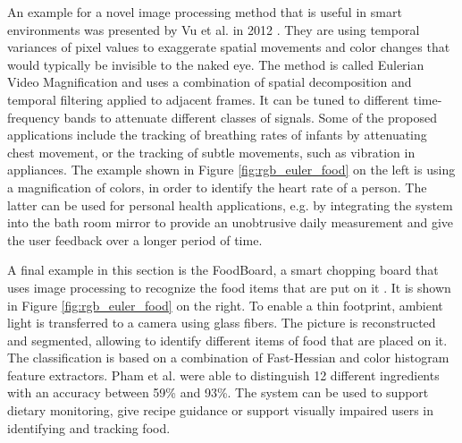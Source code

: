 An example for a novel image processing method that is useful in smart environments was presented by Vu et al. in 2012 \cite{Wu2012}. They are using  temporal variances of pixel values to exaggerate spatial movements and color changes that would typically be invisible to the naked eye. The method is called Eulerian Video Magnification and uses a combination of spatial decomposition and temporal filtering applied to adjacent frames. It can be tuned to different time-frequency bands to attenuate different classes of signals. Some of the proposed applications include the tracking of breathing rates of infants by attenuating chest movement, or the tracking of subtle movements, such as vibration in appliances. The example shown in Figure \ref{fig:rgb_euler_food} on the left is using a magnification of colors, in order to identify the heart rate of a person. The latter can be used for personal health applications, e.g. by integrating the system into the bath room mirror to provide an unobtrusive daily measurement and give the user feedback over a longer period of time.

A final example in this section is the FoodBoard, a smart chopping board that uses image processing to recognize the food items that are put on it \cite{pham2013foodboard}. It is shown in Figure \ref{fig:rgb_euler_food} on the right. To enable a thin footprint, ambient light is transferred to a camera using glass fibers. The picture is reconstructed and segmented, allowing to identify different items of food that are placed on it. The classification is based on a combination of Fast-Hessian and color histogram feature extractors. Pham et al. were able to distinguish 12 different ingredients with an accuracy between 59\% and 93\%. The system can be used to support dietary monitoring, give recipe guidance or support visually impaired users in identifying and tracking food.
